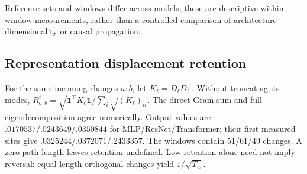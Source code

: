 Reference sets and windows differ across models; these are descriptive within-window measurements, rather than a controlled comparison of architecture dimensionality or causal propagation.

\subsection{Representation displacement retention}
For the same incoming changes $a{:}b$, let $K_\ell=D_\ell D_\ell^\top$.
Without truncating its modes, $R_{a:b}^\ell=\sqrt{\mathbf1^\top K_\ell\mathbf1}/\sum_i\sqrt{(K_\ell)_{ii}}$.
The direct Gram sum and full eigendecomposition agree numerically. Output values are
$.0170537/.0243649/.0350844$ for MLP/ResNet/Transformer; their first measured
sites give $.0325244/.0372071/.2433357$. The windows contain 51/61/49 changes.
A zero path length leaves retention undefined. Low retention alone need not
imply reversal: equal-length orthogonal changes yield $1/\sqrt{T_w}$.
